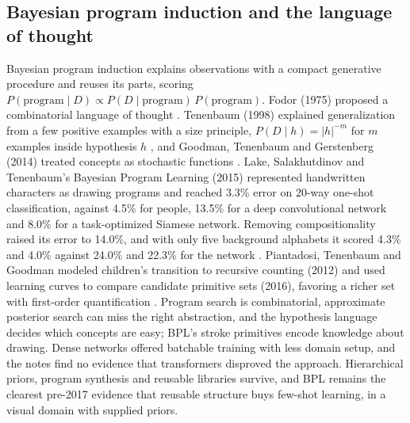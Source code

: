 \subsection{Bayesian program induction and the language of thought}
Bayesian program induction explains observations with a compact generative procedure and reuses its parts, scoring $P(\text{program}\mid D)\propto P(D\mid\text{program})\,P(\text{program})$. Fodor (1975) proposed a combinatorial language of thought \cite{pre35}. Tenenbaum (1998) explained generalization from a few positive examples with a size principle, $P(D\mid h)=|h|^{-m}$ for $m$ examples inside hypothesis $h$ \cite{pre36}, and Goodman, Tenenbaum and Gerstenberg (2014) treated concepts as stochastic functions \cite{pre38}. Lake, Salakhutdinov and Tenenbaum's Bayesian Program Learning (2015) represented handwritten characters as drawing programs and reached 3.3\% error on 20-way one-shot classification, against 4.5\% for people, 13.5\% for a deep convolutional network and 8.0\% for a task-optimized Siamese network. Removing compositionality raised its error to 14.0\%, and with only five background alphabets it scored 4.3\% and 4.0\% against 24.0\% and 22.3\% for the network \cite{pre37}. Piantadosi, Tenenbaum and Goodman modeled children's transition to recursive counting (2012) and used learning curves to compare candidate primitive sets (2016), favoring a richer set with first-order quantification \cite{pre39,pre40}. Program search is combinatorial, approximate posterior search can miss the right abstraction, and the hypothesis language decides which concepts are easy; BPL's stroke primitives encode knowledge about drawing. Dense networks offered batchable training with less domain setup, and the notes find no evidence that transformers disproved the approach. Hierarchical priors, program synthesis and reusable libraries survive, and BPL remains the clearest pre-2017 evidence that reusable structure buys few-shot learning, in a visual domain with supplied priors.

